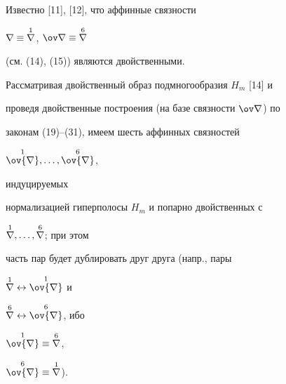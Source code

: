  


\begin{note} Известно [11], [12], что аффинные связности 


$\nabla\equiv\overset{1}{\nabla}{}$, $\ov\nabla\equiv\up{6}{\nabla}$ 


(см. (14), (15)) являются двойственными. 


Рассматривая двойственный образ подмногообразия $H_m$ [14] и 


проведя двойственные построения (на базе связности $\ov\nabla$) по 


законам (19)--(31), имеем шесть аффинных связностей


$\up{1}{\ov{\nabla}},\dotsc,\up{6}{\ov{\nabla}}$, 


индуцируемых 


нормализацией гиперполосы $H_m$ и попарно двойственных с 


$\overset{1}{\nabla}{},\dotsc,\overset{6}{\nabla}{}$; при этом 


часть пар будет дублировать друг друга (напр., пары 


$\up{1}{\nabla}\leftrightarrow\up{1}{\ov{\nabla}}$ и 


$\up{6}{\nabla}\leftrightarrow\up{6}{\ov{\nabla}}$, ибо 


$\up{1}{\ov{\nabla}}\equiv\up{6}{\nabla}$, 


$\up{6}{\ov{\nabla}}\equiv\up{1}{\nabla}$). 


\end{note}


 


